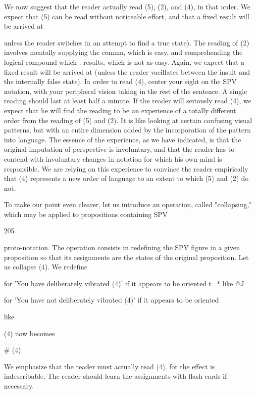 \documentclass[10pt,twoside]{memoir}
\begin{document}
\begin{enumerate}
{{{{{We now suggest that the reader actually read (5), (2), and (4), in that 
order. We expect that (5) can be read without noticeable effort, and that a 
fixed result will be arrived at {unless the reader switches in an attempt to 
find a true state). The reading of (2) involves mentally supplying the comma, 
which is easy, and comprehending the logical compound which . results, 
which is not as easy. Again, we expect that a fixed result will be arrived at 
(unless the reader vacillates between the insult and the internally false state). 
In order to read (4), center your sight on the SPV notation, with your 
peripheral vision taking in the rest of the sentence. A single reading should 
last at least half a minute. If the reader will seriously read (4), we expect that 
he will find the reading to be an experience of a totally different order from 
the reading of (5) and (2). It is like looking at certain confusing visual 
patterns, but with an entire dimension added by the incorporation of the 
pattern into language. The essence of the experience, as we have indicated, is 
that the original imputation of perspective is involuntary, and that the reader 
has to contend with involuntary changes in notation for which his own mind 
is responsible. We are relying on this experience to convince the reader 
empirically that (4) represents a new order of language to an extent to which 
(5) and (2) do not. 

To make our point even clearer, let us introduce an operation, called 
"collapsing," which may be applied to propositions containing SPV 


205 


proto-notation. The operation consists in redefining the SPV figure in a given 
proposition so that its assignments are the states of the original proposition. 
Let us collapse (4). We redefine 

for 'You have deliberately vibrated (4)' if it appears to be oriented 
t_* like @J 

for 'You have not deliberately vibrated (4)' if it appears to be oriented 

like 


(4) now becomes 


# (4) 


We emphasize that the reader must actually read (4), for the effect is 
indescribable. The reader should learn the assignments with flash cards if 
necessary. 

}}}}}}
\end{enumerate}
\end{document}
